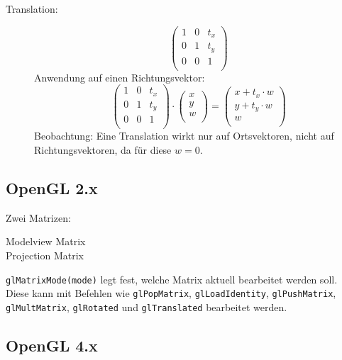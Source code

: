\documentclass{article}
\begin{document}
\begin{description}
 \item[Translation:]
  \begin{equation}
   \left(\begin{array}{ccc}
    1 & 0 & t_{x} \\
    0 & 1 & t_{y} \\
    0 & 0 & 1 \\
   \end{array}\right)
  \end{equation}
  Anwendung auf einen Richtungsvektor:
  \begin{equation}
   \left(\begin{array}{ccc}
    1 & 0 & t_{x} \\
    0 & 1 & t_{y} \\
    0 & 0 & 1 \\
   \end{array}\right)
   \cdot
   \left(\begin{array}{ccc}
    x \\
    y \\
    w \\
   \end{array}\right)
   =
   \left(\begin{array}{ccc}
    x + t_{x} \cdot w \\
    y + t_{y} \cdot w \\
    w \\
   \end{array}\right)
  \end{equation}
  Beobachtung:
  Eine Translation wirkt nur auf Ortsvektoren,
  nicht auf Richtungsvektoren,
  da für diese $w = 0$.
\end{description}

\subsection{OpenGL 2.x}
Zwei Matrizen:
\begin{description}
 \item[Modelview Matrix]
 \item[Projection Matrix]
\end{description}
\texttt{glMatrixMode(mode)} legt fest,
welche Matrix aktuell bearbeitet werden soll.
Diese kann mit Befehlen wie
\texttt{glPopMatrix},
\texttt{glLoadIdentity},
\texttt{glPushMatrix},
\texttt{glMultMatrix},
\texttt{glRotated} und
\texttt{glTranslated}
bearbeitet werden.

\subsection{OpenGL 4.x}
\end{document}
